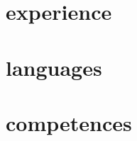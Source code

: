 \documentclass[grids]{cv-egeerardyn}
\begin{document}
\maketitle
{}
\section{experience}
\section{languages}
\section{competences}
\end{document}
